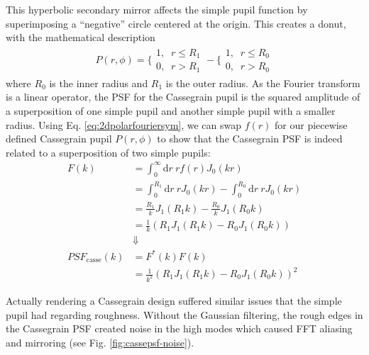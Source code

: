 \documentclass[%
 reprint,
 amsmath,amssymb,
 aps,
 pra,
]{revtex4-1}
\newcommand{\D}{\mathrm{d}}
\begin{document}
{This hyperbolic secondary mirror affects the simple pupil function by superimposing a ``negative'' circle centered at the origin. This creates a donut, with the mathematical description
% 
\begin{align*}
  P(r, \phi) = \bigg\lbrace\begin{array}{c}
  	1,\;\;r \leq R_1 \\ 
    0,\;\; r > R_1
  \end{array} - \bigg\lbrace\begin{array}{c}
  	1,\;\;r \leq R_0 \\ 
    0,\;\; r > R_0
  \end{array}
\end{align*}
where $R_0$ is the inner radius and $R_1$ is the outer radius. As the Fourier transform is a linear operator, the PSF for the Cassegrain pupil is the squared amplitude of a superposition of one simple pupil and another simple pupil with a smaller radius. Using Eq. \ref{eq:2dpolarfouriersym}, we can swap $f(r)$ for our piecewise defined Cassegrain pupil $P(r, \phi)$ to show that the Cassegrain PSF is indeed related to a superposition of two simple pupils:
% 
\begin{align*}
    F(k) &= \int_0^{\infty}\D r\ r f(r)J_0(kr) \\
         &= \int_0^{R_1}\D r\ rJ_0(kr) - \int_0^{R_0}\D r\ rJ_0(kr) \\
         &= \frac{R_1}{k}J_1(R_1 k) - \frac{R_0}{k}J_1(R_0 k) \\
         &= \frac{1}{k}\left(R_1J_1(R_1 k) - R_0J_1(R_0 k)\right) \\
         &\Downarrow \\
    PSF_{\text{casse}}(k) &= F^*(k)F(k) \\
                          &= \frac{1}{k^2}\left(R_1J_1(R_1 k) - R_0J_1(R_0 k)\right)^2
\end{align*}

Actually rendering a Cassegrain design suffered similar issues that the simple pupil had regarding roughness. Without the Gaussian filtering, the rough edges in the Cassegrain PSF created noise in the high modes which caused FFT aliasing and mirroring (see Fig. \ref{fig:cassepsf-noise}).
% 
\begin{figure}[!ht]
   \begin{minipage}{.45\textwidth}
      \centering
    \end{minipage}
    \begin{minipage}{.45\textwidth}
      \centering
    \end{minipage}
    

\end{figure}}
\end{document}
